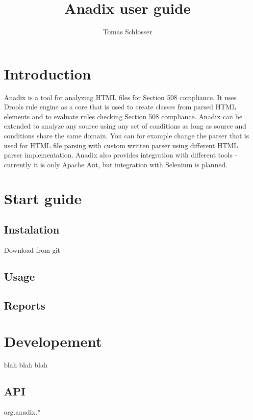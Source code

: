 \documentclass{report}
\title{Anadix user guide}
\author{Tomas Schlosser}
\begin{document}
\maketitle
\tableofcontents

\chapter{Introduction}
Anadix is a tool for analyzing HTML files for Section 508 compliance. It uses
Drools rule engine as a core that is used to create classes from parsed HTML
elements and to evaluate rules checking Section 508 compliance. Anadix can be
extended to analyze any source using any set of conditions as long as source and
conditions share the same domain. You can for example change the parser that is
used for HTML file parsing with custom written parser using different HTML
parser implementation. Anadix also provides integration with different tools -
currently it is only Apache Ant, but integration with Selenium is planned.

\chapter{Start guide}

\section{Instalation}
Download from git

\section{Usage}

\section{Reports}

\chapter{Developement}
blah blah blah
\section{API}
org.anadix.*
\end{document}
